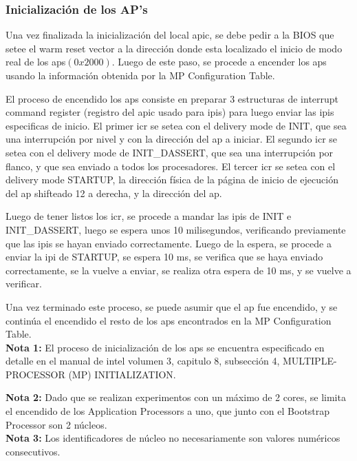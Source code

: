 \subsubsection{Inicialización de los AP's}

Una vez finalizada la inicialización del local apic, se debe pedir a la BIOS que setee el warm reset vector a la dirección donde esta localizado el inicio de modo real de los aps$(0x2000)$. Luego de este paso, se procede a encender los aps usando la información obtenida por la MP Configuration Table.

El proceso de encendido los aps consiste en preparar 3 estructuras de interrupt command register (registro del apic usado para ipis) para luego enviar las ipis especificas de inicio. El primer icr se setea con el delivery mode de INIT, que sea una interrupción por nivel y con la dirección del ap a iniciar. El segundo icr se setea con el delivery mode de INIT\_DASSERT, que sea una interrupción por flanco, y que sea enviado a todos los procesadores. El tercer icr se setea con el delivery mode STARTUP, la dirección física de la página de inicio de ejecución del ap shifteado 12 a derecha, y la dirección del ap.

Luego de tener listos los icr, se procede a mandar las ipis de INIT e INIT\_DASSERT, luego se espera unos 10 milisegundos, verificando previamente que las ipis se hayan enviado correctamente. Luego de la espera, se procede a enviar la ipi de STARTUP, se espera 10 ms, se verifica que se haya enviado correctamente, se la vuelve a enviar, se realiza otra espera de 10 ms, y se vuelve a verificar.

Una vez terminado este proceso, se puede asumir que el ap fue encendido, y se continúa el encendido el resto de los aps encontrados en la MP Configuration Table.\\

\textbf{Nota 1: } El proceso de inicialización de los aps se encuentra especificado en detalle en el manual de intel volumen 3, capitulo 8, subsección 4, MULTIPLE-PROCESSOR (MP) INITIALIZATION.

\textbf{Nota 2: } Dado que se realizan experimentos con un máximo de 2 cores, se limita el encendido de los Application Processors a uno, que junto con el Bootstrap Processor son 2 núcleos.\\

\textbf{Nota 3: } Los identificadores de núcleo no necesariamente son valores numéricos consecutivos.